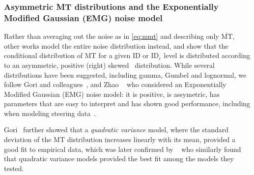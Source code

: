 \documentclass[acmlarge, manuscript,review]{acmart}
\newcommand{\mmt}{\ensuremath{\overline{\mt}}\xspace}
\newcommand{\mt}{\ensuremath{{\text{MT}}}\xspace}
\newcommand{\ide}{\ensuremath{{\text{ID}_e}}\xspace}
\begin{document}
\subsubsection{Asymmetric MT distributions and the Exponentially Modified Gaussian (EMG) noise model \label{subs:rw::emg}}
Rather than averaging out the noise as in \autoref{eq:mmt} and describing only \mmt, other works model the entire noise distribution instead, and show that the conditional distribution of MT for a given ID or \ide level is distributed according to an asymmetric, positive (right) skewed~\cite{gori2018these,gori2019,zhao2022, jude2016,nieuwenhuizen2016, li2024,chapuis2007} distribution.
While several distributions have been suggested, including gamma, Gumbel and lognormal, we follow Gori and colleagues~\cite{gori2018these,gori2019, li2024}, and Zhao \etal~\cite{zhao2022} who considered an Exponentially Modified Gaussian (EMG) noise model: it is positive, is assymetric, %
has parameters that are easy to interpret and has shown good performance, including when modeling steering data~\cite{wang2021}.%





Gori~\cite{gori2018these} further showed that a \textit{quadratic variance} model, where the standard deviation of the MT distribution increases linearly with its mean, provided a good fit to empirical data,
which was later confirmed by \citeauthor{zhao2022}~\cite{zhao2022} who similarly found that quadratic variance models provided the best fit among the models they tested.
\end{document}
